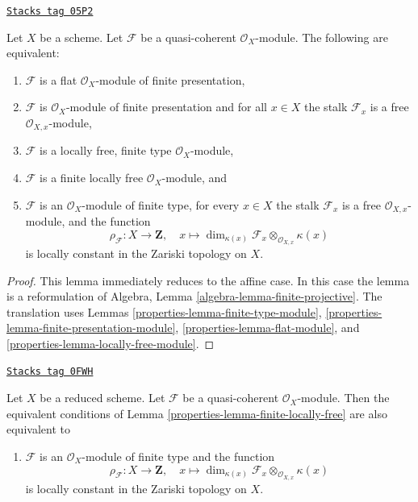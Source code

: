 \begin{lemma}
\label{properties-lemma-finite-locally-free}
\href{https://stacks.math.columbia.edu/tag/05P2}{\texttt{Stacks tag 05P2}}

Let $X$ be a scheme.
Let $\mathcal{F}$ be a quasi-coherent $\mathcal{O}_X$-module.
The following are equivalent:
\begin{enumerate}
\item $\mathcal{F}$ is a flat $\mathcal{O}_X$-module of finite presentation,
\item $\mathcal{F}$ is $\mathcal{O}_X$-module of finite presentation and
for all $x \in X$ the stalk $\mathcal{F}_x$ is a free
$\mathcal{O}_{X, x}$-module,
\item $\mathcal{F}$ is a locally free, finite type $\mathcal{O}_X$-module,
\item $\mathcal{F}$ is a finite locally free $\mathcal{O}_X$-module, and
\item $\mathcal{F}$ is an $\mathcal{O}_X$-module of finite type,
for every $x \in X$ the stalk $\mathcal{F}_x$ is a free
$\mathcal{O}_{X, x}$-module, and the function
$$
\rho_\mathcal{F} : X \to \mathbf{Z}, \quad
x \longmapsto
\dim_{\kappa(x)} \mathcal{F}_x \otimes_{\mathcal{O}_{X, x}} \kappa(x)
$$
is locally constant in the Zariski topology on $X$.
\end{enumerate}
\end{lemma}

\begin{proof}

This lemma immediately reduces to the affine case.
In this case the lemma is a reformulation of
Algebra, Lemma \ref{algebra-lemma-finite-projective}.
The translation uses
Lemmas \ref{properties-lemma-finite-type-module},
\ref{properties-lemma-finite-presentation-module},
\ref{properties-lemma-flat-module}, and
\ref{properties-lemma-locally-free-module}.
\end{proof}

\begin{lemma}
\label{properties-lemma-finite-locally-free-reduced}
\href{https://stacks.math.columbia.edu/tag/0FWH}{\texttt{Stacks tag 0FWH}}

Let $X$ be a reduced scheme. Let $\mathcal{F}$ be a quasi-coherent
$\mathcal{O}_X$-module. Then the equivalent conditions of
Lemma \ref{properties-lemma-finite-locally-free} are also equivalent to
\begin{enumerate}
\item[(6)] $\mathcal{F}$ is an $\mathcal{O}_X$-module of finite type and
the function
$$
\rho_\mathcal{F} : X \to \mathbf{Z}, \quad
x \longmapsto
\dim_{\kappa(x)} \mathcal{F}_x \otimes_{\mathcal{O}_{X, x}} \kappa(x)
$$
is locally constant in the Zariski topology on $X$.
\end{enumerate}
\end{lemma}


